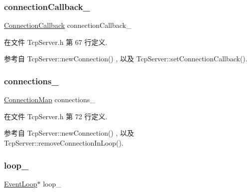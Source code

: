 \mbox{\label{classmuduo_1_1TcpServer_ae4ac7fea1abbcfb56d481dbe8ffb37e7}} 
\subsubsection{\texorpdfstring{connection\+Callback\+\_\+}{connectionCallback\_}}
{\footnotesize\ttfamily \hyperlink{namespacemuduo_ac7f7b0c9c9e96123dfea3fe120a2c404}{Connection\+Callback} connection\+Callback\+\_\+\hspace{0.3cm}{\ttfamily [private]}}



在文件 Tcp\+Server.\+h 第 67 行定义.



参考自 Tcp\+Server\+::new\+Connection() , 以及 Tcp\+Server\+::set\+Connection\+Callback().

\mbox{\label{classmuduo_1_1TcpServer_a07322e7616e616baff3de1675028979a}} 
\subsubsection{\texorpdfstring{connections\+\_\+}{connections\_}}
{\footnotesize\ttfamily \hyperlink{classmuduo_1_1TcpServer_a757ed86be3708eee03ff754c5108abdd}{Connection\+Map} connections\+\_\+\hspace{0.3cm}{\ttfamily [private]}}



在文件 Tcp\+Server.\+h 第 72 行定义.



参考自 Tcp\+Server\+::new\+Connection() , 以及 Tcp\+Server\+::remove\+Connection\+In\+Loop().

\mbox{\label{classmuduo_1_1TcpServer_a19968f50018d32ac31f5cba0195591ac}} 
\subsubsection{\texorpdfstring{loop\+\_\+}{loop\_}}
{\footnotesize\ttfamily \hyperlink{classmuduo_1_1EventLoop}{Event\+Loop}$\ast$ loop\+\_\+\hspace{0.3cm}{\ttfamily [private]}}



